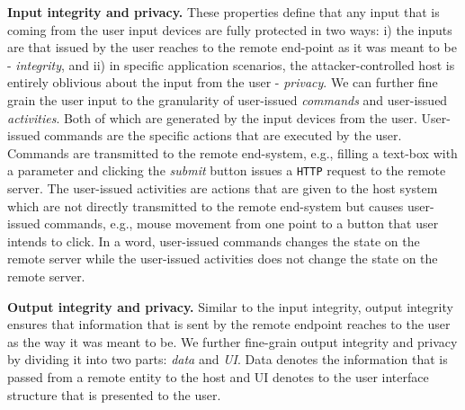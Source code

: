 \begin{mylist}
  \item \textbf{Input integrity and privacy.} These properties define that any input that is coming from the user input devices are fully protected in two ways: i) the inputs are that issued by the user reaches to the remote end-point as it was meant to be - \emph{integrity}, and ii) in specific application scenarios, the attacker-controlled host is entirely oblivious about the input from the user - \emph{privacy}. We can further fine grain the user input to the granularity of user-issued \emph{commands} and user-issued \emph{activities}. Both of which are generated by the input devices from the user. User-issued commands are the specific actions that are executed by the user. Commands are transmitted to the remote end-system, e.g., filling a text-box with a parameter and clicking the \emph{submit} button issues a \texttt{HTTP} request to the remote server. The user-issued activities are actions that are given to the host system which are not directly transmitted to the remote end-system but causes user-issued commands, e.g., mouse movement from one point to a button that user intends to click. In a word, user-issued commands changes the state on the remote server while the user-issued activities does not change the state on the remote server.  
  
  \item \textbf{Output integrity and privacy.} Similar to the input integrity, output integrity ensures that information that is sent by the remote endpoint reaches to the user as the way it was meant to be. We further fine-grain output integrity and privacy by dividing it into two parts: \emph{data} and \emph{UI}. Data denotes the information that is passed from a remote entity to the host and UI denotes to the user interface structure that is presented to the user.
  
  \end{mylist}



\iffalse
\myparagraph{Advantages}

\begin{enumerate}
  \item The \device does not need to know the formatting/template of the page. As the \device only looks to the current mouse position, the structure of the page is somewhat irrelevant (?).
\end{enumerate}
\fi

